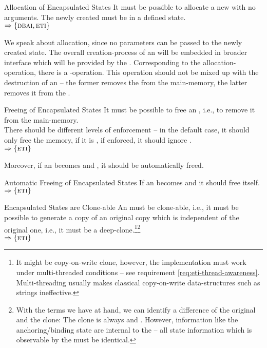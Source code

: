 \documentclass[a4paper, 12pt]{book}
\newcommand{\INTERFACE}[1]{$\Rightarrow\left\{#1\right\}$}
\begin{document}
\begin{requirement*}{Allocation of Encapsulated States}
  It must be possible to allocate a new 
  with no arguments. The newly created  must be in a
  defined state.\\
  \INTERFACE{\DBAI,\ETI}
\end{requirement*}
%
We speak about allocation, since no parameters can be passed to the newly
created state. The overall creation-process of an  will be embedded in broader interface which will be provided by the
. 
%
Corresponding to the allocation-operation, there is a -operation. This operation
should not be mixed up with the destruction of an  --
the former removes the  from the main-memory, the
latter removes it from the . 
\begin{requirement*}{Freeing of Encapsulated States}
  It must be possible to free an , i.e., to remove it
  from the main-memory.\\
  There should be different levels of enforcement -- in the default case, it
  should only free the memory, if it is , if enforced, it should
  ignore .\\
  \INTERFACE{\ETI}
\end{requirement*}
Moreover, if an  becomes  and , it
should be automatically freed.
\begin{requirement*}{Automatic Freeing of Encapsulated States}
  If an  becomes  and  it
  should free itself.\\
  \INTERFACE{\ETI}
\end{requirement*}

\begin{requirement*}{Encapsulated States are Clone-able}
  An  must be clone-able, i.e., it must be possible to
  generate a  copy of an original copy which is
  independent of the original one, i.e., it must be a deep-clone.\footnote{It
    might be copy-on-write clone, however, the implementation must work under
    multi-threaded conditions -- see requirement
    \vref{req:eti-thread-awareness}. Multi-threading usually makes classical
    copy-on-write data-structures such as strings ineffective.}\footnote{
  With the terms we have at hand, we can identify a difference of the
  original and the clone: The clone is always  and
  . However, information like the anchoring/binding
  state are internal to the \SYNEIGHT -- all state information
  which is observable by the  must be identical.}\\
  \INTERFACE{\ETI}
\end{requirement*}
\end{document}
